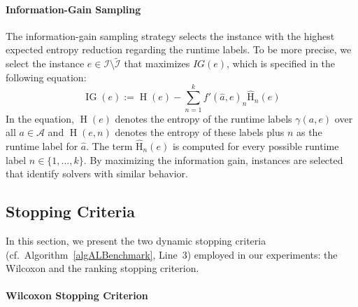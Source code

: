 \documentclass[sn-basic, Numbered]{sn-jnl} %
\begin{document}
\paragraph{Information-Gain Sampling}

The information-gain sampling strategy selects the instance with the highest expected entropy reduction regarding the runtime labels.
To be more precise, we select the instance $e \in \mathcal{I} \setminus \tilde{\mathcal{I}}$ that maximizes $IG(e)$, which is specified in the following equation:
%
\begin{equation*}
  \operatorname{IG}(e) := \operatorname{H}(e) - \sum_{n = 1}^{k} f'(\hat{a}, e)_{n} \operatorname{\hat H}_n(e)
\end{equation*}
%
In the equation, $\operatorname{H}(e)$ denotes the entropy of the runtime labels $\gamma(a, e)$ over all $a \in \mathcal{A}$ and $\operatorname{H}(e, n)$ denotes the entropy of these labels plus $n$ as the runtime label for $\hat{a}$.
The term $\operatorname{\hat H}_n(e)$ is computed for every possible runtime label $n \in \{1, \dots, k\}$.
By maximizing the information gain, instances are selected that identify solvers with similar behavior.

\subsection{Stopping Criteria}
\label{sec:main:stopping}

In this section, we present the two dynamic stopping criteria (cf.~Algorithm~\ref{algALBenchmark}, Line~3) employed in our experiments: the Wilcoxon and the ranking stopping criterion.

\paragraph{Wilcoxon Stopping Criterion}
\end{document}
